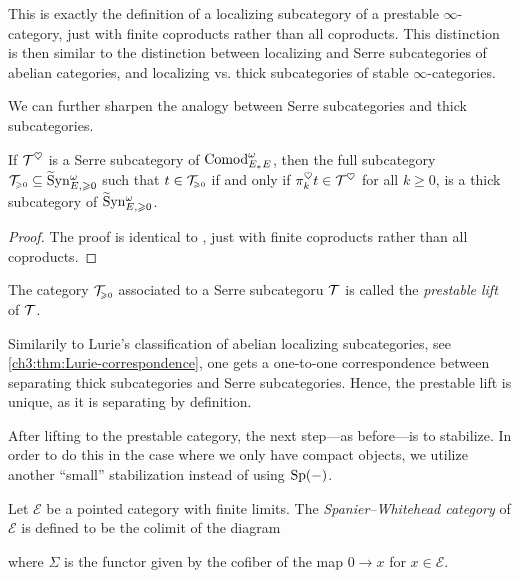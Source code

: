 \begin{remark}
    This is exactly the definition of a localizing subcategory of a prestable $\infty$-category, just with finite coproducts rather than all coproducts. This distinction is then similar to the distinction between localizing and Serre subcategories of abelian categories, and localizing vs. thick subcategories of stable $\infty$-categories. 
\end{remark}

We can further sharpen the analogy between Serre subcategories and thick subcategories. 

\begin{lemma}
    If $\mathcal{T}^\heartsuit$ is a Serre subcategory of $\mathrm{Comod}_{E_*E}^\omega$, then the full subcategory $\mathcal{T}_{\hspace{-1pt}\scriptscriptstyle\geqslant 0}\subseteq \widetilde{\mathrm{S}}\mathrm{yn}_{E, \geqslant 0}^\omega$ such that $t\in \mathcal{T}_{\hspace{-1pt}\scriptscriptstyle\geqslant 0}$ if and only if $\pi^\heartsuit_k t \in \mathcal{T}^\heartsuit$ for all $k\geq 0$, is a thick subcategory of $\widetilde{\mathrm{S}}\mathrm{yn}_{E, \geqslant 0}^\omega$. 
\end{lemma}
\begin{proof}
    The proof is identical to \cite[C.5.2.7]{lurie_SAG}, just with finite coproducts rather than all coproducts. 
\end{proof}

\begin{definition}
    The category $\mathcal{T}_{\hspace{-1pt}\scriptscriptstyle\geqslant 0}$ associated to a Serre subcategoru $\mathcal{T}$ is called the \emph{prestable lift} of $\mathcal{T}$. 
\end{definition}

\begin{definition}
    Similarily to Lurie's classification of abelian localizing subcategories, see \cref{ch3:thm:Lurie-correspondence}, one gets a one-to-one correspondence between separating thick subcategories and Serre subcategories. Hence, the prestable lift is unique, as it is separating by definition. 
\end{definition}

After lifting to the prestable category, the next step---as before---is to stabilize. In order to do this in the case where we only have compact objects, we utilize another ``small'' stabilization instead of using $\mathrm{Sp}(-)$. 

\begin{definition}
    Let $\mathcal{E}$ be a pointed category with finite limits. The \emph{Spanier--Whitehead category} of $\mathcal{E}$ is defined to be the colimit of the diagram 
    \begin{center}
    \end{center}
    where $\Sigma$ is the functor given by the cofiber of the map $0\rightarrow x$ for $x\in \mathcal{E}$. 
\end{definition}

